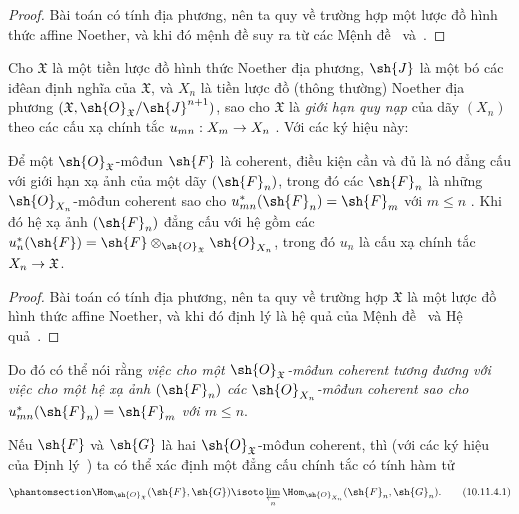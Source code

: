 \documentclass[oneside]{amsart}
\makeatletter
\renewcommand{\leq}{\leqslant}
\newcommand{\ega@arrow}[2]{\mathchoice{#1}{#2}{#2}{#2}}
\renewcommand{\to}{\ega@arrow{\longrightarrow}{\rightarrow}}
\let\EGAOriginalLabel\label
\renewcommand{\label}[1]{\phantomsection\EGAOriginalLabel{#1}}
\makeatother
\begin{document}
\begin{proof}
Bài toán có tính địa phương, nên ta quy về trường hợp một lược đồ hình thức affine Noether, và khi đó mệnh đề suy ra từ các Mệnh đề~ và~.
\end{proof}

\begin{env}[10.11.2]
\label{I.10.11.2}
Cho $\mathfrak{X}$ là một tiền lược đồ hình thức Noether địa phương, $\sh{J}$ là một bó các iđêan định nghĩa của $\mathfrak{X}$, và $X_n$ là tiền lược đồ (thông thường) Noether địa phương $(\mathfrak{X},\sh{O}_\mathfrak{X}/\sh{J}^{n+1})$, sao cho $\mathfrak{X}$ là \emph{giới hạn quy nạp} của dãy $(X_n)$ theo các cấu xạ chính tắc $u_{mn}:X_m\to X_n$ .
Với các ký hiệu này:
\end{env}

\begin{theorem}[10.11.3]
\label{I.10.11.3}
Để một $\sh{O}_\mathfrak{X}$-môđun $\sh{F}$ là coherent, điều kiện cần và đủ là nó đẳng cấu với giới hạn xạ ảnh của một dãy $(\sh{F}_n)$, trong đó các $\sh{F}_n$ là những $\sh{O}_{X_n}$-môđun coherent sao cho $u_{mn}^*(\sh{F}_n)=\sh{F}_m$ với $m\leq n$ .
Khi đó hệ xạ ảnh $(\sh{F}_n)$ đẳng cấu với hệ gồm các $u_n^*(\sh{F})=\sh{F}\otimes_{\sh{O}_\mathfrak{X}}\sh{O}_{X_n}$, trong đó $u_n$ là cấu xạ chính tắc $X_n\to\mathfrak{X}$.
\end{theorem}

\begin{proof}
Bài toán có tính địa phương, nên ta quy về trường hợp $\mathfrak{X}$ là một lược đồ hình thức affine Noether, và khi đó định lý là hệ quả của Mệnh đề~ và Hệ quả~.
\end{proof}

Do đó có thể nói rằng \emph{việc cho một $\sh{O}_\mathfrak{X}$-môđun coherent tương đương với việc cho một hệ xạ ảnh $(\sh{F}_n)$ các $\sh{O}_{X_n}$-môđun coherent sao cho $u_{mn}^*(\sh{F}_n)=\sh{F}_m$ với $m\leq n$}.

\begin{corollary}[10.11.4]
\label{I.10.11.4}
Nếu $\sh{F}$ và $\sh{G}$ là hai $\sh{O}_\mathfrak{X}$-môđun coherent, thì (với các ký hiệu của Định lý~) ta có thể xác định một đẳng cấu chính tắc có tính hàm tử
\[
\label{I.10.11.4.1}
  \Hom_{\sh{O}_\mathfrak{X}}(\sh{F},\sh{G})\isoto\varprojlim_n\Hom_{\sh{O}_{X_n}}(\sh{F}_n,\sh{G}_n).
  \tag{10.11.4.1}
\]
\end{corollary}
\end{document}
